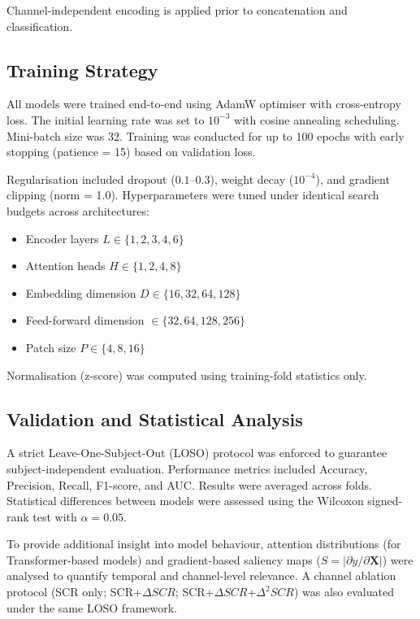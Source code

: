 \documentclass[runningheads]{llncs}
\begin{document}
Channel-independent encoding is applied prior to concatenation and classification.

\subsection{Training Strategy}

All models were trained end-to-end using AdamW optimiser with cross-entropy loss. The initial learning rate was set to $10^{-3}$ with cosine annealing scheduling. Mini-batch size was 32. Training was conducted for up to 100 epochs with early stopping (patience = 15) based on validation loss.

Regularisation included dropout ($0.1$–$0.3$), weight decay ($10^{-4}$), and gradient clipping (norm = 1.0). Hyperparameters were tuned under identical search budgets across architectures:

\begin{itemize}
\item Encoder layers $L \in \{1,2,3,4,6\}$
\item Attention heads $H \in \{1,2,4,8\}$
\item Embedding dimension $D \in \{16,32,64,128\}$
\item Feed-forward dimension $\in \{32,64,128,256\}$
\item Patch size $P \in \{4,8,16\}$
\end{itemize}

Normalisation (z-score) was computed using training-fold statistics only.

\subsection{Validation and Statistical Analysis}

A strict Leave-One-Subject-Out (LOSO) protocol was enforced to guarantee subject-independent evaluation. Performance metrics included Accuracy, Precision, Recall, F1-score, and AUC. Results were averaged across folds. 
Statistical differences between models were assessed using the Wilcoxon signed-rank test with $\alpha = 0.05$.

To provide additional insight into model behaviour, attention distributions (for Transformer-based models) and gradient-based saliency maps ($S = |\partial y / \partial \mathbf{X}|$) were analysed to quantify temporal and channel-level relevance. A channel ablation protocol (SCR only; SCR+$\Delta SCR$; SCR+$\Delta SCR$+$\Delta^2 SCR$) was also evaluated under the same LOSO framework.
\end{document}
